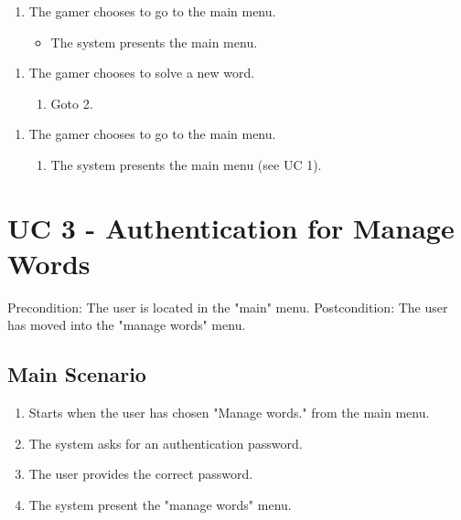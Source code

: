 \documentclass[12pt, letterpaper]{article}
\begin{document}
\begin{enumerate}[label=3.1.]
\begin{enumerate}[label=3.1 b]
\begin{enumerate}[label=3.1 b.\arabic*]
			\begin{enumerate}[label=3.1 b.3.]
				\item The gamer chooses to go to the main menu.
				\begin{itemize}
					\item The system presents the main menu. 
				\end{itemize}
			\end{enumerate}
				
		\end{enumerate}
	\end{enumerate}
\end{enumerate}
\begin{enumerate}[label=7.1.]
	\item The gamer chooses to solve a new word. 
	\begin{enumerate}[label=7.1.\arabic*]
		\item Goto 2.
	\end{enumerate}
\end{enumerate}
\begin{enumerate}[label=7.2.]
	\item The gamer chooses to go to the main menu. 
	\begin{enumerate}[label=7.2.\arabic*]
		\item The system presents the main menu (see UC 1).
	\end{enumerate}
\end{enumerate}

\section{UC 3 - Authentication for Manage Words}
Precondition: The user is located in the "main" menu.
\newline
Postcondition: The user has moved into the "manage words" menu.
\subsection{Main Scenario}
\begin{enumerate}
	\item Starts when the user has chosen "Manage words." from the main menu.
	\item The system asks for an authentication password.
	\item The user provides the correct password.
	\item The system present the "manage words" menu.
\end{enumerate}
\end{document}
